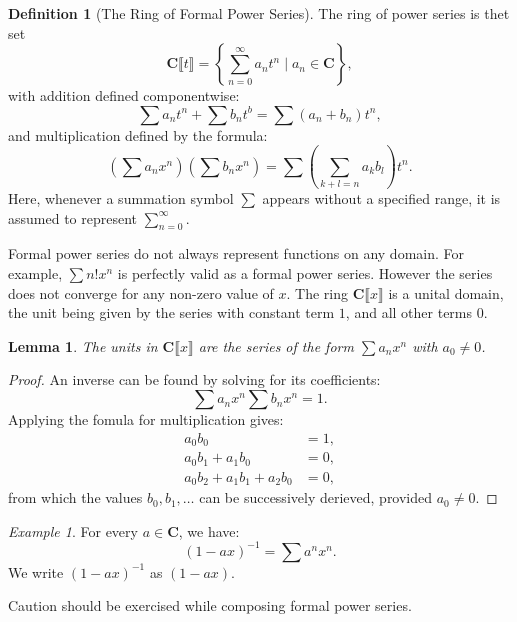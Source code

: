 \documentclass{amsbook}
\newcommand{\CC}{\mathbf C}
\newcommand{\ps}[1]{\CC\llbracket#1\rrbracket}
\newtheorem{lemma}[theorem]{Lemma}
\theoremstyle{definition}
\newtheorem{definition}[theorem]{Definition}
\theoremstyle{remark}
\newtheorem{example}[theorem]{Example}
\begin{document}
\begin{definition}
  [The Ring of Formal Power Series]
  The ring of power series is thet set
  \begin{displaymath}
    \ps t = \left\{\sum_{n=0}^\infty a_nt^n\mid a_n\in \CC\right\},
  \end{displaymath}
  with addition defined componentwise:
  \begin{displaymath}
    \sum  a_n t^n + \sum b_nt^b = \sum (a_n+b_n) t^n,
  \end{displaymath}
  and multiplication defined by the formula:
  \begin{displaymath}
    \left(\sum a_n x^n\right)\left(\sum b_n x^n\right) = \sum \left(\sum_{k+l=n} a_kb_l\right)t^n.
  \end{displaymath}
  Here, whenever a summation symbol $\sum$ appears without a specified range, it is assumed to represent $\sum_{n=0}^\infty$.
\end{definition}
Formal power series do not always represent functions on any domain. For example, $\sum n!x^n$ is perfectly valid as a formal power series.
However the series does not converge for any non-zero value of $x$.
The ring $\ps x$ is a unital domain, the unit being given by the series with constant term $1$, and all other terms $0$.
\begin{lemma}
  The units in $\ps x$ are the series of the form $\sum a_nx^n$ with $a_0\neq 0$.
\end{lemma}
\begin{proof}
  An inverse can be found by solving for its coefficients:
  \begin{displaymath}
    \sum a_n x^n \sum b_n x^n =1.
  \end{displaymath}
  Applying the fomula for multiplication gives:
  \begin{align*}
    a_0b_0 &  = 1,\\
    a_0b_1 + a_1b_0 & = 0,\\
    a_0b_2 + a_1b_1 + a_2b_0 & = 0,
  \end{align*}
  from which the values $b_0,b_1,\dotsc$ can be successively derieved, provided $a_0\neq 0$.
\end{proof}
\begin{example}
  For every $a\in \CC$, we have:
  \begin{displaymath}
    (1-ax)^{-1} = \sum a^nx^n.
  \end{displaymath}
  We write $(1-ax)^{-1}$ as $(1-ax)$.
\end{example}
Caution should be exercised while composing formal power series.
\end{document}
